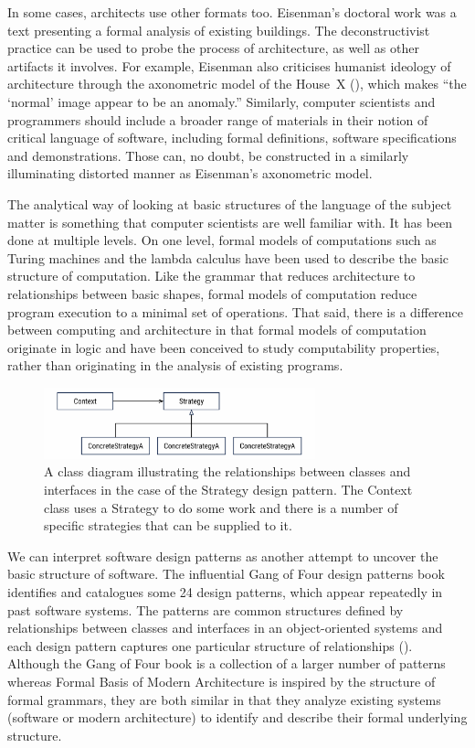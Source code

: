 In some cases, architects use other formats too. Eisenman's doctoral work was a text presenting
a formal analysis of existing buildings. The deconstructivist practice can be used to probe the
process of architecture, as well as other artifacts it involves. For example,
Eisenman also criticises humanist ideology of architecture through the
axonometric model of the House~X (), which makes
``the `normal' image appear to be an anomaly.''
Similarly, computer scientists and programmers should include a broader range of materials in
their notion of critical language of software, including formal definitions, software
specifications and demonstrations. Those can, no doubt, be constructed in a similarly
illuminating distorted manner as Eisenman's axonometric model.

The analytical way of looking at basic structures of the language of the subject matter is something
that computer scientists are well familiar with. It has been done at multiple levels. On one
level, formal models of computations such as Turing machines and the lambda calculus have been
used to describe the basic structure of computation. Like the grammar that reduces architecture
to relationships between basic shapes, formal models of computation reduce program execution to
a minimal set of operations. That said, there is a difference between computing and architecture
in that formal models of computation originate in logic and have been conceived to study
computability properties, rather than originating in the analysis of existing programs.

\begin{figure}
\centering
\includegraphics[width=0.7\textwidth]{fig/strategy.png}
\caption{A class diagram illustrating the relationships between classes and interfaces in the
case of the Strategy design pattern. The Context class uses a Strategy to do some work and
there is a number of specific strategies that can be supplied to it.}
\label{fig:strategy}
\end{figure}

We can interpret software design patterns as another attempt to uncover the basic
structure of software. The influential Gang of Four design patterns book identifies
and catalogues some 24 design patterns, which appear repeatedly in past software systems. The
patterns are common structures defined by relationships between classes and interfaces in an
object-oriented systems and each design pattern captures one particular structure
of relationships (). Although the Gang of Four book is a collection of
a larger number of patterns whereas Formal Basis of Modern Architecture is inspired by the structure
of formal grammars, they are both similar in that they analyze existing systems (software or modern
architecture) to identify and describe their formal underlying structure.


